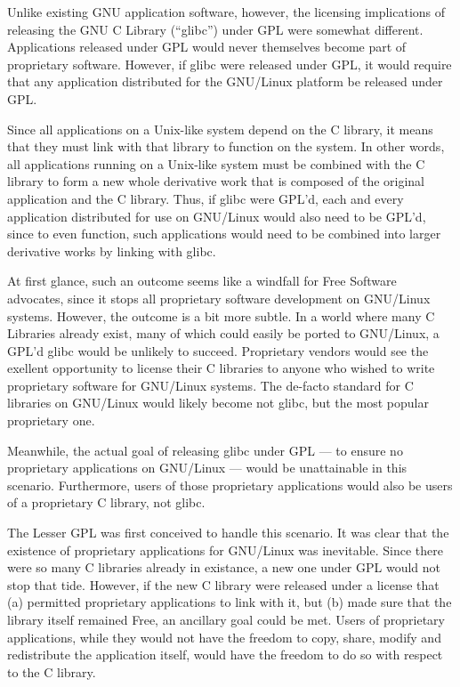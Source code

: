 \documentclass[12pt]{report}
\begin{document}
Unlike existing GNU application software, however, the licensing
implications of releasing the GNU C Library (``glibc'') under GPL were
somewhat different.  Applications released under GPL would never
themselves become part of proprietary software.  However, if glibc were
released under GPL, it would require that any application distributed for
the GNU/Linux platform be released under GPL.

Since all applications on a Unix-like system depend on the C library, it
means that they must link with that library to function on the system.  In
other words, all applications running on a Unix-like system must be
combined with the C library to form a new whole derivative work that is
composed of the original application and the C library.  Thus, if glibc
were GPL'd, each and every application distributed for use on GNU/Linux
would also need to be GPL'd, since to even function, such applications
would need to be combined into larger derivative works by linking with
glibc.

At first glance, such an outcome seems like a windfall for Free Software
advocates, since it stops all proprietary software development on
GNU/Linux systems.  However, the outcome is a bit more subtle.  In a world
where many C Libraries already exist, many of which could easily be ported
to GNU/Linux, a GPL'd glibc would be unlikely to succeed.  Proprietary
vendors would see the exellent opportunity to license their C libraries to
anyone who wished to write proprietary software for GNU/Linux systems.
The de-facto standard for C libraries on GNU/Linux would likely become not
glibc, but the most popular proprietary one.

Meanwhile, the actual goal of releasing glibc under GPL --- to ensure no
proprietary applications on GNU/Linux --- would be unattainable in this
scenario.  Furthermore, users of those proprietary applications would also
be users of a proprietary C library, not glibc.

The Lesser GPL was first conceived to handle this scenario.  It was clear
that the existence of proprietary applications for GNU/Linux was
inevitable.  Since there were so many C libraries already in existance, a
new one under GPL would not stop that tide.  However, if the new C library
were released under a license that (a) permitted proprietary applications
to link with it, but (b) made sure that the library itself remained Free,
an ancillary goal could be met.  Users of proprietary applications, while
they would not have the freedom to copy, share, modify and redistribute
the application itself, would have the freedom to do so with respect to
the C library.
\end{document}
